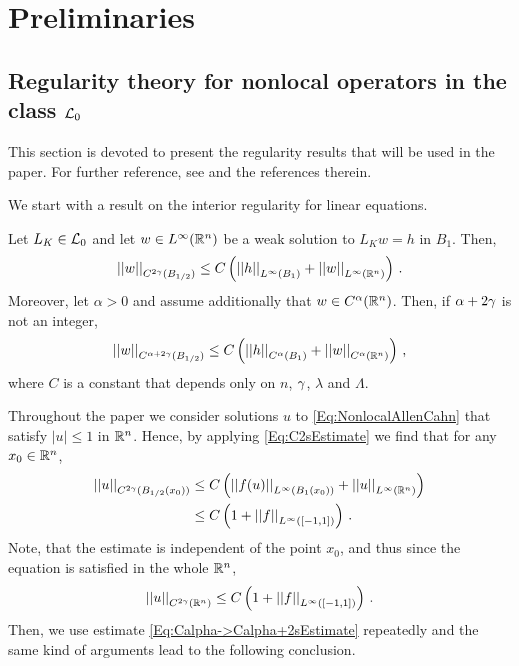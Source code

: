 \section{Preliminaries}
\label{Sec:Preliminaries}


\subsection{Regularity theory for nonlocal operators in the class $\mathcal{L}_0$}
\label{Subsec:Regularity}


This section is devoted to present the regularity results that will be used in the paper. For further reference, see \cite{RosOton-Survey,SerraC2s+alphaRegularity} and the references therein.

We start with a result on the interior regularity for linear equations.

\begin{proposition}
	\label{Prop:InteriorRegularity}
	Let $L_K \in\mathcal{L}_0$ and let $w\in L^\infty (\mathbb{R}^n)$ be a weak solution to $L_K w = h$ in $B_1$. Then,
	\begin{equation}
	\label{Eq:C2sEstimate}
	\left | \left |{w} \right | \right |_{C^{2\gamma} (B_{1/2})} \leq C\left ( {\left | \left |{h} \right | \right |_{L^\infty (B_1)} + \left | \left |{w} \right | \right |_{L^\infty  (\mathbb{R}^n)} }\right )\,.
	\end{equation}
	Moreover, let $\alpha > 0$ and assume additionally that $w \in C^\alpha (\mathbb{R}^n)$. Then, if $\alpha +
	2\gamma$ is not an integer,
	\begin{equation}
	\label{Eq:Calpha->Calpha+2sEstimate}
	\left | \left |{w} \right | \right |_{C^{\alpha + 2\gamma} (B_{1/2})} \leq C\left ( {\left | \left |{h} \right | \right |_{C^{\alpha} (B_1)} + \left | \left |{w} \right | \right |_{C^\alpha (\mathbb{R}^n)} }\right )\,,
	\end{equation}
	where $C$ is a constant that depends only on $n$, $\gamma$, $\lambda$ and $\Lambda$.
\end{proposition}


Throughout the paper we consider solutions $u$ to \eqref{Eq:NonlocalAllenCahn} that satisfy $|u|\leq 1$ in $\mathbb{R}^n$. Hence, by applying \eqref{Eq:C2sEstimate} we find that for any $x_0\in \mathbb{R}^n$,
\begin{align*}
\left | \left |{u} \right | \right |_{C^{2\gamma} (B_{1/2} (x_0))} &\leq C\left ( {\left | \left |{f(u)} \right | \right |_{L^\infty (B_1(x_0))} + \left | \left |{u} \right | \right |_{L^\infty  (\mathbb{R}^n)} }\right ) \\
&\leq C\left ( {1 + \left | \left |{f} \right | \right |_{L^\infty ([-1,1])} }\right )\,.
\end{align*}
Note, that the estimate is independent of the point $x_0$, and thus since the equation is satisfied in the whole $\mathbb{R}^n$,
$$
\left | \left |{u} \right | \right |_{C^{2\gamma}(\mathbb{R}^n)} \leq C\left ( {1 + \left | \left |{f} \right | \right |_{L^\infty ([-1,1])} }\right )\,.
$$
Then, we use estimate \eqref{Eq:Calpha->Calpha+2sEstimate} repeatedly and  the same kind of arguments lead to the following conclusion.


